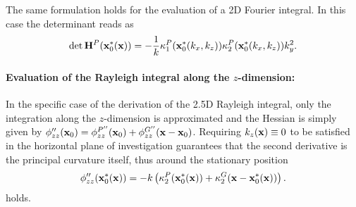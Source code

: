 The same formulation holds for the evaluation of a 2D Fourier integral.
In this case the determinant reads as
\begin{equation}
\mathrm{det} \, \mathbf{H}^P(\mathbf{x}_0^*(\mathbf{x}))  = -\frac{1}{k} \kappa_1^P(\mathbf{x}_0^*(k_x,k_z)) \kappa_2^P(\mathbf{x}_0^*(k_x,k_z	)) k_y^2.
\end{equation}


\paragraph{Evaluation of the Rayleigh integral along the $z$-dimension:}
In the specific case of the derivation of the 2.5D Rayleigh integral, only the integration along the $z$-dimension is approximated and the Hessian is simply given by $\phi''_{zz}(\mathbf{x}_0) =\phi^{P''}_{zz}(\mathbf{x}_0) + \phi^{G''}_{zz}(\mathbf{x}-\mathbf{x}_0)$.
Requiring $k_z(\mathbf{x}) \equiv 0$ to be satisfied in the horizontal plane of investigation guarantees that the second derivative is the principal curvature itself, thus around the stationary position
\begin{equation}
\phi''_{zz}(\mathbf{x}_0^*(\mathbf{x})) = -k \left( \kappa_2^P(\mathbf{x}_0^*(\mathbf{x})) + \kappa_2^G(\mathbf{x}-\mathbf{x}_0^*(\mathbf{x})) \right).
\end{equation}
holds.